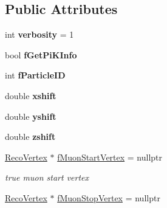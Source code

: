 \subsection*{Public Attributes}
\begin{DoxyCompactItemize}
\item 
\hypertarget{classMCRecoEventLoader_a42b09a53c17f03a6e4fcce20cd4c56b1}{
int {\bfseries verbosity} = 1}
\label{classMCRecoEventLoader_a42b09a53c17f03a6e4fcce20cd4c56b1}

\item 
\hypertarget{classMCRecoEventLoader_a0d3eb072ae7301282ba510bbd11ffb0d}{
bool {\bfseries fGetPiKInfo}}
\label{classMCRecoEventLoader_a0d3eb072ae7301282ba510bbd11ffb0d}

\item 
\hypertarget{classMCRecoEventLoader_ab936432f202a835b7877dbc63303a57c}{
int {\bfseries fParticleID}}
\label{classMCRecoEventLoader_ab936432f202a835b7877dbc63303a57c}

\item 
\hypertarget{classMCRecoEventLoader_aefded74813d943854628aa0da13953ff}{
double {\bfseries xshift}}
\label{classMCRecoEventLoader_aefded74813d943854628aa0da13953ff}

\item 
\hypertarget{classMCRecoEventLoader_a008cd13186e5458c4232376980ff8430}{
double {\bfseries yshift}}
\label{classMCRecoEventLoader_a008cd13186e5458c4232376980ff8430}

\item 
\hypertarget{classMCRecoEventLoader_a5320937dd08d67c172b0f90956615e11}{
double {\bfseries zshift}}
\label{classMCRecoEventLoader_a5320937dd08d67c172b0f90956615e11}

\item 
\hypertarget{classMCRecoEventLoader_a06c8c257c06cca00a6b34c51365e6d69}{
\hyperlink{classRecoVertex}{RecoVertex} $\ast$ \hyperlink{classMCRecoEventLoader_a06c8c257c06cca00a6b34c51365e6d69}{fMuonStartVertex} = nullptr}
\label{classMCRecoEventLoader_a06c8c257c06cca00a6b34c51365e6d69}

\begin{DoxyCompactList}\small\item\em true muon start vertex \item\end{DoxyCompactList}\item 
\hypertarget{classMCRecoEventLoader_ab4eb6938d73f33b4d4fbcaccd28f9c65}{
\hyperlink{classRecoVertex}{RecoVertex} $\ast$ \hyperlink{classMCRecoEventLoader_ab4eb6938d73f33b4d4fbcaccd28f9c65}{fMuonStopVertex} = nullptr}
\label{classMCRecoEventLoader_ab4eb6938d73f33b4d4fbcaccd28f9c65}


\end{DoxyCompactItemize}
